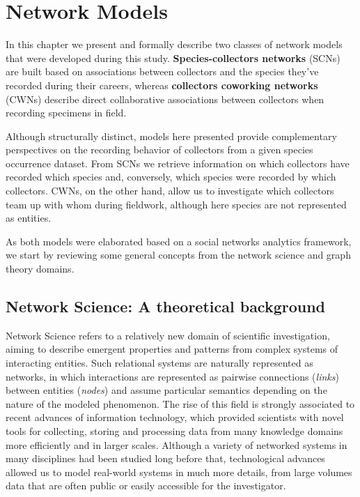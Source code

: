\chapter{Network Models}\label{network_models}


In this chapter we present and formally describe two classes of network models that were developed during this study.
\textbf{Species-collectors networks} (SCNs) are built based on associations between collectors and the species they've recorded during their careers, whereas \textbf{collectors coworking networks} (CWNs) describe direct collaborative associations between collectors when recording specimens in field.

Although structurally distinct, models here presented provide complementary perspectives on the recording behavior of collectors from a given species occurrence dataset. 
From SCNs we retrieve information on which collectors have recorded which species and, conversely, which species were recorded by which collectors. 
CWNs, on the other hand, allow us to investigate which collectors team up with whom during fieldwork, although here species are not represented as entities.

As both models were elaborated based on a social networks analytics framework, we start by reviewing some general concepts from the network science and graph theory domains.




\section{Network Science: A theoretical background}

Network Science refers to a relatively new domain of scientific investigation, aiming to describe emergent properties and patterns from complex systems of interacting entities.
Such relational systems are naturally represented as networks, in which interactions are represented as pairwise connections (\textit{links}) between entities (\textit{nodes}) and assume particular semantics depending on the nature of the modeled phenomenon.
The rise of this field is strongly associated to recent advances of information technology, which provided scientists with novel tools for collecting, storing and processing data from many knowledge domains more efficiently and in larger scales.
Although a variety of networked systems in many disciplines had been studied long before that, technological advances allowed us to model real-world systems in much more details, from large volumes data that are often public or easily accessible for the investigator.


